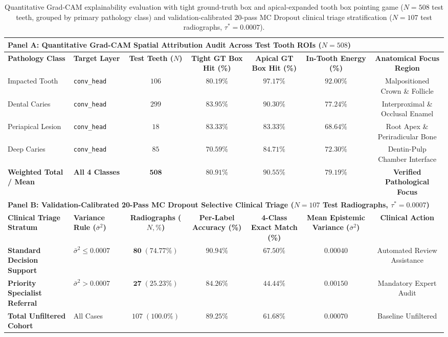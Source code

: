 \documentclass[review]{elsarticle}
\begin{document}
\begin{table}[t]
\centering
\caption{Quantitative Grad-CAM explainability evaluation with tight ground-truth box and apical-expanded tooth box pointing game ($N=508$ test teeth, grouped by primary pathology class) and validation-calibrated 20-pass MC Dropout clinical triage stratification ($N=107$ test radiographs, $\tau^* = 0.0007$).}
\label{tab:xai_triage}
\begin{adjustbox}{width=\textwidth}
\begin{tabular}{llccccc}
\toprule
\multicolumn{7}{l}{\textbf{Panel A: Quantitative Grad-CAM Spatial Attribution Audit Across Test Tooth ROIs ($N = 508$)}} \\
\midrule
\textbf{Pathology Class} & \textbf{Target Layer} & \textbf{Test Teeth ($N$)} & \textbf{Tight GT Box Hit (\%)} & \textbf{Apical GT Box Hit (\%)} & \textbf{In-Tooth Energy (\%)} & \textbf{Anatomical Focus Region} \\
\midrule
Impacted Tooth & \texttt{conv\_head} & $106$ & $80.19\%$ & $\mathbf{97.17\%}$ & $92.00\%$ & Malpositioned Crown \& Follicle \\
Dental Caries & \texttt{conv\_head} & $299$ & $83.95\%$ & $\mathbf{90.30\%}$ & $77.24\%$ & Interproximal \& Occlusal Enamel \\
Periapical Lesion & \texttt{conv\_head} & $18$ & $83.33\%$ & $\mathbf{83.33\%}$ & $68.64\%$ & Root Apex \& Periradicular Bone \\
Deep Caries & \texttt{conv\_head} & $85$ & $70.59\%$ & $\mathbf{84.71\%}$ & $72.30\%$ & Dentin-Pulp Chamber Interface \\
\textbf{Weighted Total / Mean} & \textbf{All 4 Classes} & $\mathbf{508}$ & $\mathbf{80.91\%}$ & $\mathbf{90.55\%}$ & $\mathbf{79.19\%}$ & \textbf{Verified Pathological Focus} \\
\midrule
\multicolumn{7}{l}{\textbf{Panel B: Validation-Calibrated 20-Pass MC Dropout Selective Clinical Triage ($N = 107$ Test Radiographs, $\tau^* = 0.0007$)}} \\
\midrule
\textbf{Clinical Triage Stratum} & \textbf{Variance Rule ($\bar{\sigma}^2$)} & \textbf{Radiographs ($N, \%$)} & \textbf{Per-Label Accuracy (\%)} & \textbf{4-Class Exact Match (\%)} & \textbf{Mean Epistemic Variance ($\bar{\sigma}^2$)} & \textbf{Clinical Action} \\
\midrule
\textbf{Standard Decision Support} & $\bar{\sigma}^2 \le 0.0007$ & $\mathbf{80\;(74.77\%)}$ & $\mathbf{90.94\%}$ & $\mathbf{67.50\%}$ & $0.00040$ & Automated Review Assistance \\
\textbf{Priority Specialist Referral} & $\bar{\sigma}^2 > 0.0007$ & $\mathbf{27\;(25.23\%)}$ & $84.26\%$ & $44.44\%$ & $0.00150$ & Mandatory Expert Audit \\
\textbf{Total Unfiltered Cohort} & All Cases & $107\;(100.0\%)$ & $89.25\%$ & $61.68\%$ & $0.00070$ & Baseline Unfiltered \\
\bottomrule
\end{tabular}
\end{adjustbox}
\end{table}
\end{document}
